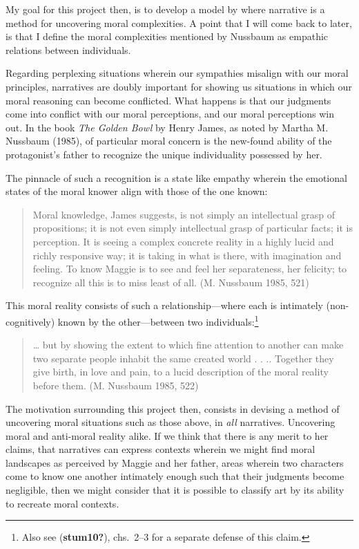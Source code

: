 \documentclass[12pt]{book}
\theoremstyle{definition}
\theoremstyle{remark}
\begin{document}
My goal for this project then, is to develop a model by where narrative is a method for uncovering moral complexities. A point that I will come back to later, is that I define the moral complexities mentioned by Nussbaum as empathic relations between individuals.

Regarding perplexing situations wherein our sympathies misalign with our moral principles, narratives are doubly important for showing us situations in which our moral reasoning can become conflicted. What happens is that our judgments come into conflict with our moral perceptions, and our moral perceptions win out. In the book \emph{The Golden Bowl} by Henry James, as noted by Martha M. Nussbaum (1985), of particular moral concern is the new-found ability of the protagonist's father to recognize the unique individuality possessed by her.

The pinnacle of such a recognition is a state like empathy wherein the emotional states of the moral knower align with those of the one known:

\begin{quote}
Moral knowledge, James suggests, is not simply an intellectual grasp of propositions; it is not even simply intellectual grasp of particular facts; it is perception. It is seeing a complex concrete reality in a highly lucid and richly responsive way; it is taking in what is there, with imagination and feeling. To know Maggie is to see and feel her separateness, her felicity; to recognize all this is to miss least of all. (M. Nussbaum 1985, 521)
\end{quote}

This moral reality consists of such a relationship---where each is intimately (non-cognitively) known by the other---between two individuals:\footnote{Also see (\textbf{stum10?}), chs.~2--3 for a separate defense of this claim.}

\begin{quote}
\ldots{} but by showing the extent to which fine attention to another can make two separate people inhabit the same created world . . .. Together they give birth, in love and pain, to a lucid description of the moral reality before them. (M. Nussbaum 1985, 522)
\end{quote}

The motivation surrounding this project then, consists in devising a method of uncovering moral situations such as those above, in \emph{all} narratives. Uncovering moral and anti-moral reality alike. If we think that there is any merit to her claims, that narratives can express contexts wherein we might find moral landscapes as perceived by Maggie and her father, areas wherein two characters come to know one another intimately enough such that their judgments become negligible, then we might consider that it is possible to classify art by its ability to recreate moral contexts.
\end{document}
